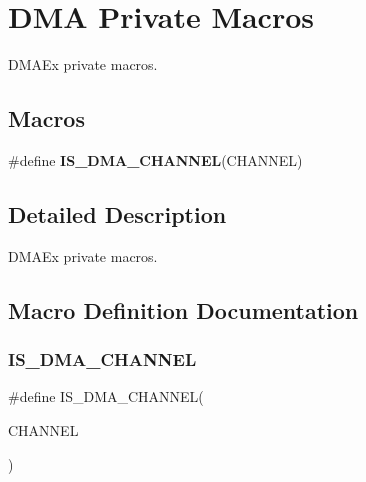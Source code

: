 \hypertarget{group___d_m_a_ex___private___macros}{}\section{D\+MA Private Macros}
\label{group___d_m_a_ex___private___macros}


D\+M\+A\+Ex private macros.  


\subsection*{Macros}
\begin{DoxyCompactItemize}
\item 
\#define {\bfseries I\+S\+\_\+\+D\+M\+A\+\_\+\+C\+H\+A\+N\+N\+EL}(C\+H\+A\+N\+N\+EL)
\end{DoxyCompactItemize}


\subsection{Detailed Description}
D\+M\+A\+Ex private macros. 



\subsection{Macro Definition Documentation}
\mbox{\label{group___d_m_a_ex___private___macros_gac7f4709d9244f25b853789d888a74d46}} 
\subsubsection{\texorpdfstring{IS\_DMA\_CHANNEL}{IS\_DMA\_CHANNEL}}
{\footnotesize\ttfamily \#define I\+S\+\_\+\+D\+M\+A\+\_\+\+C\+H\+A\+N\+N\+EL(\begin{DoxyParamCaption}\item[{}]{C\+H\+A\+N\+N\+EL }\end{DoxyParamCaption})}

